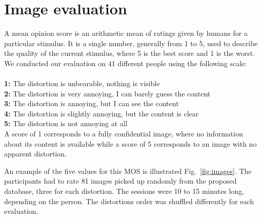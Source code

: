 \documentclass{article}
\begin{document}
\section{Image evaluation}
\label{sec:evaluation}
A mean opinion score is an arithmetic mean of ratings given by humans for a particular stimulus. It is a single number, generally from 1 to 5, used to describe the quality of the current stimulus, where 5 is the best score and 1 is the worst. We conducted our evaluation on 41 different people using the following scale:\\\\
\textbf{1:} The distortion is unbearable, nothing is visible\\
\textbf{2:} \small{The distortion is very annoying, I can barely guess the content}\normalsize{}\\
\textbf{3:} The distortion is annoying, but I can see the content\\
\textbf{4:} The distortion is slightly annoying, but the content is clear\\
\textbf{5:} The distortion is not annoying at all \\

A score of 1 corresponds to a fully confidential image, where no information about its content is available while a score of 5 corresponds to an image with no apparent distortion.%


An example of the five values for this MOS is illustrated Fig.~\ref{fig:images}. The participants had to rate 81 images picked up randomly from the proposed database, three for each distortion. The sessions were 10 to 15 minutes long, depending on the person. The distortions order was shuffled differently for each evaluation. %
\end{document}
